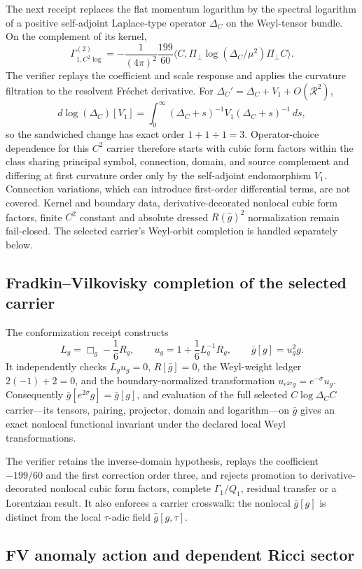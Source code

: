 \documentclass[11pt]{article}
\theoremstyle{definition}
\theoremstyle{remark}
\begin{document}
The next receipt replaces the flat momentum logarithm by the spectral
logarithm of a positive self-adjoint Laplace-type operator $\Delta_C$ on the
Weyl-tensor bundle.  On the complement of its kernel,
\[
 \Gamma_{1,C^2\log}^{(2)}
 =-\frac1{(4\pi)^2}\frac{199}{60}
 \langle C,\Pi_\perp\log(\Delta_C/\mu^2)\Pi_\perp C\rangle.
\]
The verifier replays the coefficient and scale response and applies the
curvature filtration to the resolvent Fréchet derivative.  For
$\Delta_C'=\Delta_C+V_1+O(\mathcal R^2)$,
\[
 d\log(\Delta_C)[V_1]
 =\int_0^\infty(\Delta_C+s)^{-1}V_1
 (\Delta_C+s)^{-1}\,ds,
\]
so the sandwiched change has exact order $1+1+1=3$.  Operator-choice
dependence for this $C^2$ carrier therefore starts with cubic form
factors within the class sharing principal symbol, connection, domain, and
source complement and differing at first curvature order only by the
self-adjoint endomorphism $V_1$.  Connection variations, which can introduce
first-order differential terms, are not covered.  Kernel and boundary
data, derivative-decorated nonlocal cubic form factors, finite $C^2$ constant and absolute dressed
$R(\widehat g)^2$ normalization remain fail-closed.  The selected carrier's
Weyl-orbit completion is handled separately below.

\subsection{Fradkin--Vilkovisky completion of the selected carrier}

The conformization receipt constructs
\[
 L_g=\Box_g-\frac16R_g,\qquad
 u_g=1+\frac16L_g^{-1}R_g,\qquad
 \bar g[g]=u_g^2g.
\]
It independently checks $L_gu_g=0$, $R[\bar g]=0$, the Weyl-weight ledger
$2(-1)+2=0$, and the boundary-normalized transformation
$u_{e^{2\sigma}g}=e^{-\sigma}u_g$.  Consequently $\bar g[e^{2\sigma}g]=\bar
g[g]$, and evaluation of the full selected $C\log\Delta_C C$ carrier---its
tensors, pairing, projector, domain and logarithm---on $\bar g$ gives an exact
nonlocal functional invariant under the declared local Weyl transformations.

The verifier retains the inverse-domain hypothesis, replays the coefficient
$-199/60$ and the first correction order three, and rejects promotion to
derivative-decorated nonlocal cubic form factors, complete
$\Gamma_1/Q_1$, residual transfer or a Lorentzian result.  It also enforces a
carrier crosswalk: the nonlocal $\bar g[g]$ is distinct from the local
$\tau$-adic field $\widehat g[g,\tau]$.

\subsection{FV anomaly action and dependent Ricci sector}
\end{document}

